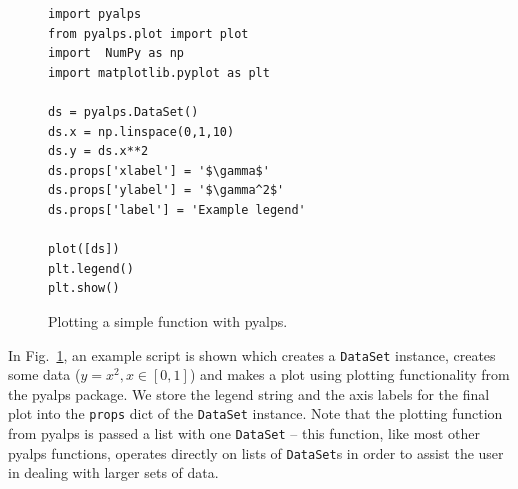 \documentclass[12pt]{iopart}
\begin{document}
\begin{figure}
\begin{lstlisting}
import pyalps
from pyalps.plot import plot
import  NumPy as np
import matplotlib.pyplot as plt

ds = pyalps.DataSet()
ds.x = np.linspace(0,1,10)
ds.y = ds.x**2
ds.props['xlabel'] = '$\gamma$'
ds.props['ylabel'] = '$\gamma^2$'
ds.props['label'] = 'Example legend'

plot([ds])
plt.legend()
plt.show()
\end{lstlisting}
\caption{Plotting a simple function with pyalps.}
\label{fig:plotting}
\end{figure}

In Fig.~\ref{fig:plotting}, an example script is shown which creates a {\tt DataSet} instance, creates some data ($y = x^2, x \in [0,1]$) and makes a plot using plotting functionality from the pyalps package. We store the legend string and the axis labels for the final plot into the {\tt props} dict of the {\tt DataSet} instance. Note that the plotting function from pyalps is passed a list with one {\tt DataSet} -- this function, like most other pyalps functions, operates directly on lists of {\tt DataSet}s in order to assist the user in dealing with larger sets of data.

\end{document}
